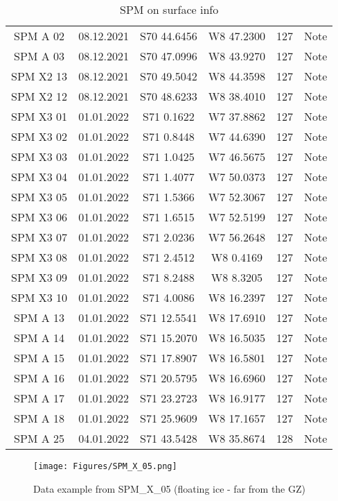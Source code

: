 \documentclass[a4paper,12pt]{article}
\begin{document}
\begin{table}[H]
\begin{tabular}[width=\textwidth]{c c c c c c}
    SPM A 02 & 08.12.2021 & S70 44.6456 & W8 47.2300 & 127 & Note \\
    SPM A 03 & 08.12.2021 & S70 47.0996 & W8 43.9270 & 127 & Note \\
    SPM X2 13 & 08.12.2021 & S70 49.5042 & W8 44.3598 & 127 & Note \\
    SPM X2 12 & 08.12.2021 & S70 48.6233 & W8 38.4010 & 127 & Note \\
    SPM X3 01 & 01.01.2022 & S71 0.1622 & W7 37.8862 & 127 & Note \\
    SPM X3 02 & 01.01.2022 & S71 0.8448 & W7 44.6390 & 127 & Note \\
    SPM X3 03 & 01.01.2022 & S71 1.0425 & W7 46.5675 & 127 & Note \\
    SPM X3 04 & 01.01.2022 & S71 1.4077 & W7 50.0373 & 127 & Note \\
    SPM X3 05 & 01.01.2022 & S71 1.5366 & W7 52.3067 & 127 & Note \\
    SPM X3 06 & 01.01.2022 & S71 1.6515 & W7 52.5199 & 127 & Note \\
    SPM X3 07 & 01.01.2022 & S71 2.0236 & W7 56.2648 & 127 & Note \\
    SPM X3 08 & 01.01.2022 & S71 2.4512 & W8 0.4169 & 127 & Note \\
    SPM X3 09 & 01.01.2022 & S71 8.2488 & W8 8.3205 & 127 & Note \\
    SPM X3 10 & 01.01.2022 & S71 4.0086 & W8 16.2397 & 127 & Note \\
    SPM A 13 & 01.01.2022 & S71 12.5541 & W8 17.6910 & 127 & Note \\
    SPM A 14 & 01.01.2022 & S71 15.2070 & W8 16.5035 & 127 & Note \\
    SPM A 15 & 01.01.2022 & S71 17.8907 & W8 16.5801 & 127 & Note \\
    SPM A 16 & 01.01.2022 & S71 20.5795 & W8 16.6960 & 127 & Note \\
    SPM A 17 & 01.01.2022 & S71 23.2723 & W8 16.9177 & 127 & Note \\
    SPM A 18 & 01.01.2022 & S71 25.9609 & W8 17.1657 & 127 & Note \\
    SPM A 25 & 04.01.2022 & S71 43.5428 & W8 35.8674 & 128 & Note \\
    \hline
  \end{tabular}
  \caption{SPM on surface info}
  \label{Table_SPM_surface}
\end{table}

\begin{figure}[H]
	\texttt{[image: Figures/SPM\_X\_05.png]}
	\caption{Data example from SPM\_X\_05 (floating ice - far from the GZ)}
	\label{fig_SPM_X_05}
\end{figure}
\end{document}
